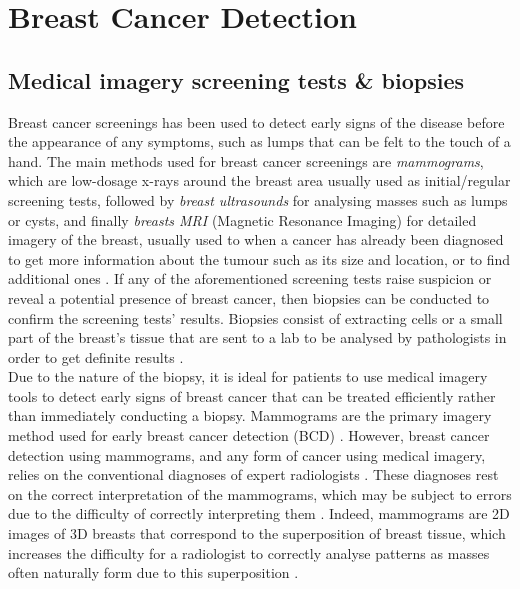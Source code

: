 
\section{Breast Cancer Detection}

\subsection{Medical imagery screening tests \& biopsies}
\label{sec:litreview-bcd-medical-imagery}

Breast cancer screenings has been used to detect early signs of the disease before the appearance of any symptoms, such as lumps that can be felt to the touch of a hand. The main methods used for breast cancer screenings are \textit{mammograms}, which are low-dosage x-rays around the breast area usually  used as initial/regular screening tests, followed by \textit{breast ultrasounds} for analysing masses such as lumps or cysts, and finally \textit{breasts MRI} (Magnetic Resonance Imaging) for detailed imagery of the breast, usually used to when a cancer has already been diagnosed to get more information about the tumour such as its size and location, or to find additional ones \cite{americanCancerSociety2019}. If any of the aforementioned screening tests raise suspicion or reveal a potential presence of breast cancer, then biopsies can be conducted to confirm the screening tests' results. Biopsies consist of extracting cells or a small part of the breast's tissue that are sent to a lab to be analysed by pathologists in order to get definite results \cite{martin2019}.\\

Due to the nature of the biopsy, it is ideal for patients to use medical imagery tools to detect early signs of breast cancer that can be treated efficiently rather than immediately conducting a biopsy. Mammograms are the primary imagery method used for early breast cancer detection (BCD) \cite{Ramos-Pollan2012}. However, breast cancer detection using mammograms, and any form of cancer using medical imagery, relies on the conventional diagnoses of expert radiologists \cite{Osareh2010}. These diagnoses rest on the correct interpretation of the mammograms, which may be subject to errors due to the difficulty of correctly interpreting them \cite{Elter2009}. Indeed, mammograms are 2D images of 3D breasts that correspond to the superposition of breast tissue, which increases the difficulty for a radiologist to correctly analyse patterns as masses often naturally form due to this superposition \cite{Elter2009}.

